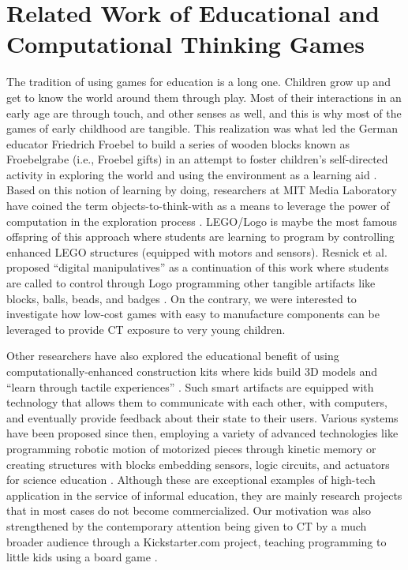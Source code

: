 \documentclass{acm_proc_article-sp}
\begin{document}
\section{\sloppy Related Work of Educational and Computational Thinking Games}
\label{sec:ed_games}
The tradition of using games for education is a long one. Children grow up and get to know the world around them through play.
Most of their interactions in an early age are through touch, and other senses as well, and this is why most of the games of early childhood are tangible.
This realization was what led the German educator Friedrich Froebel to build a series of wooden blocks known as Froebelgrabe (i.e., Froebel gifts) in an attempt to foster children's self-directed activity in exploring the world and using the environment as a learning aid \cite{liebschner1992child}.
Based on this notion of learning by doing, researchers at MIT Media Laboratory have coined the term objects-to-think-with as a means to leverage the power of computation in the exploration process \cite{resnick1998digital,schweikardt2006roblocks}. LEGO/Logo is maybe the most famous offspring of this approach where students are learning to program by controlling enhanced LEGO structures (equipped with motors and sensors).
Resnick et al. proposed ``digital manipulatives'' as a continuation of this work where students are called to control through Logo programming other tangible artifacts like blocks, balls, beads, and badges \cite{liebschner1992child}.
On the contrary, we were interested to investigate how low-cost games with easy to manufacture components can be leveraged to provide CT exposure to very young children. 

Other researchers have also explored the educational benefit of using computationally-enhanced construction kits where kids build 3D models and ``learn through tactile experiences'' \cite{eisenberg2002computationally}.
Such smart artifacts are equipped with technology that allows them to communicate with each other, with computers, and eventually provide feedback about their state to their users.
Various systems have been proposed since then, employing a variety of advanced technologies like programming robotic motion of motorized pieces through kinetic memory \cite{raffle2004topobo} or creating structures with blocks embedding sensors, logic circuits, and actuators for science education \cite{schweikardt2006roblocks}.
Although these are exceptional examples of high-tech application in the service of informal education, they are mainly research projects that in most cases do not become commercialized.
Our motivation was also strengthened by the contemporary attention being given to CT by a much broader audience through a Kickstarter.com project, teaching programming to little kids using a board game \cite{robotturtles}.
\end{document}
